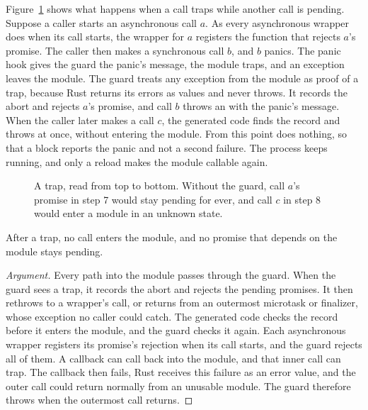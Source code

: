 \documentclass[sigconf,nonacm]{acmart}
\begin{document}
Figure~\ref{fig:trap} shows what happens when a call traps while another call is pending. Suppose a caller starts an asynchronous call $a$. As every asynchronous wrapper does when its call starts, the wrapper for $a$ registers the function that rejects $a$'s promise. The caller then makes a synchronous call $b$, and $b$ panics. The panic hook gives the guard the panic's message, the module traps, and an exception leaves the module. The guard treats any exception from the module as proof of a trap, because Rust returns its errors as values and never throws. It records the abort and rejects $a$'s promise, and call $b$ throws an  with the panic's message. When the caller later makes a call $c$, the generated code finds the record and throws at once, without entering the module. From this point  does nothing, so that a  block reports the panic and not a second failure. The process keeps running, and only a reload makes the module callable again.

\begin{figure}[t]
\centering

\caption{A trap, read from top to bottom. Without the guard, call $a$'s promise in step 7 would stay pending for ever, and call $c$ in step 8 would enter a module in an unknown state.}
\label{fig:trap}
\end{figure}

\begin{claim}[Trap]
\label{clm:trap}
After a trap, no call enters the module, and no promise that depends on the module stays pending.
\end{claim}

\begin{proof}[Argument]
Every path into the module passes through the guard. When the guard sees a trap, it records the abort and rejects the pending promises. It then rethrows to a wrapper's call, or returns from an outermost microtask or finalizer, whose exception no caller could catch. The generated code checks the record before it enters the module, and the guard checks it again. Each asynchronous wrapper registers its promise's rejection when its call starts, and the guard rejects all of them. A callback can call back into the module, and that inner call can trap. The callback then fails, Rust receives this failure as an error value, and the outer call could return normally from an unusable module. The guard therefore throws when the outermost call returns.
\end{proof}
\end{document}
